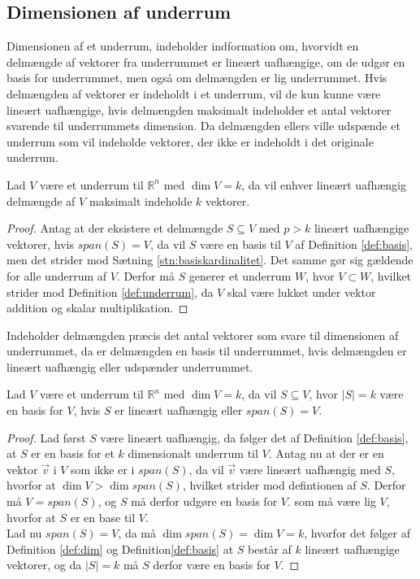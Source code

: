 \subsection{Dimensionen af underrum}
Dimensionen af et underrum, indeholder indformation om, hvorvidt en delmængde af vektorer fra underrummet er lineært uafhængige, om de udgør en basis for underrummet, men også om delmængden er lig underrummet.
Hvis delmængden af vektorer er indeholdt i et underrum, vil de kun kunne være lineært uafhængige, hvis delmængden maksimalt indeholder et antal vektorer svarende til underrummets dimension. 
Da delmængden ellers ville udspænde et underrum som vil indeholde vektorer, der ikke er indeholdt i det originale underrum.
\begin{kor}
Lad $V$ være et underrum til $\mathds{R}^n$ med $\dim{V}=k$, da vil enhver lineært uafhængig delmængde af $V$ maksimalt indeholde $k$ vektorer.
\label{kor:linearuafhangighedunderrum}
\end{kor}
\begin{proof}
Antag at der eksistere et delmængde $S \subseteq V$ med $p > k$ lineært uafhængige vektorer, hvis $span(S) = V$, da vil $S$ være en basis til $V$ af Definition \ref{def:basis}, men det strider mod Sætning \ref{stn:basiskardinalitet}. Det samme gør sig gældende for alle underrum af $V$.
Derfor må $S$ generer et underrum $W$, hvor $V \subset W$, hvilket strider mod Definition \ref{def:underrum}, da $V$ skal være lukket under vektor addition og skalar multiplikation.
\end{proof}
Indeholder delmængden præcis det antal vektorer som svare til dimensionen af underrummet, da er delmængden en basis til underrummet, hvis delmængden er lineært uafhængig eller udspænder underrummet.
\begin{kor}
Lad $V$ være et underrum til $\mathds{R}^n$ med $\dim{V}=k$, da vil $S \subseteq V$, hvor $|S|=k$ være en basis for $V$, hvis $S$ er lineært uafhængig eller $span(S) = V$.
\label{kor:serbase}
\end{kor}
\begin{proof}
Lad først $S$ være lineært uafhængig, da følger det af Definition \ref{def:basis}, at $S$ er en basis for et $k$ dimensionalt underrum til $V$.
Antag nu at der er en vektor $\vec{v}$ i $V$ som ikke er i $span(S)$, da vil $\vec{v}$ være lineært uafhængig med $S$, hvorfor at $\dim{V} > \dim{span(S)}$, hvilket strider mod defintionen af $S$. 
Derfor må $V = span(S)$, og $S$ må derfor udgøre en basis for $V$.
 som må være lig $V$, hvorfor at $S$ er en base til $V$.
\\Lad nu $span(S) = V$, da må $\dim{span(S)} = \dim{V} = k$, hvorfor det følger af Definition \ref{def:dim} og Definition\ref{def:basis} at $S$ består af $k$ lineært uafhængige vektorer, og da $|S|=k$ må $S$ derfor være en basis for $V$.
\end{proof}
